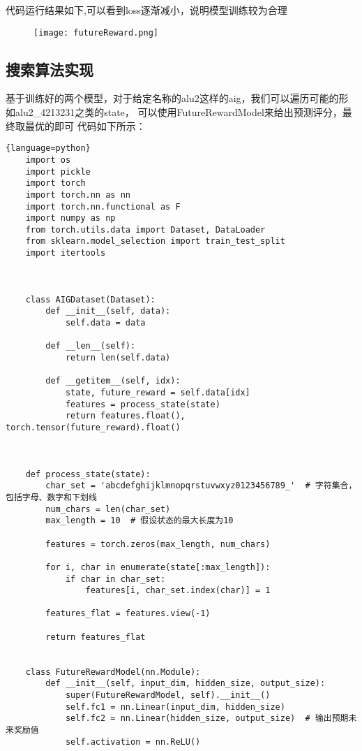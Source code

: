 \documentclass[UTF8]{ctexart}
\begin{document}
代码运行结果如下,可以看到loss逐渐减小，说明模型训练较为合理
\begin{figure}[H]
    \centering
    \texttt{[image: futureReward.png]}
    
    \caption{}
    \label{fig:futureReward}
\end{figure}\par
\subsection{搜索算法实现}
基于训练好的两个模型，对于给定名称的alu2这样的aig，我们可以遍历可能的形如alu2\_4213231之类的state，
可以使用FutureRewardModel来给出预测评分，最终取最优的即可
代码如下所示：
\begin{lstlisting}{language=python}
    import os
    import pickle
    import torch
    import torch.nn as nn
    import torch.nn.functional as F
    import numpy as np
    from torch.utils.data import Dataset, DataLoader
    from sklearn.model_selection import train_test_split
    import itertools
    
    
    
    class AIGDataset(Dataset):
        def __init__(self, data):
            self.data = data
    
        def __len__(self):
            return len(self.data)
    
        def __getitem__(self, idx):
            state, future_reward = self.data[idx]
            features = process_state(state)
            return features.float(), torch.tensor(future_reward).float()
    
    
    
    def process_state(state):
        char_set = 'abcdefghijklmnopqrstuvwxyz0123456789_'  # 字符集合，包括字母、数字和下划线
        num_chars = len(char_set)
        max_length = 10  # 假设状态的最大长度为10
    
        features = torch.zeros(max_length, num_chars)
    
        for i, char in enumerate(state[:max_length]):
            if char in char_set:
                features[i, char_set.index(char)] = 1
    
        features_flat = features.view(-1)
    
        return features_flat
    
    
    class FutureRewardModel(nn.Module):
        def __init__(self, input_dim, hidden_size, output_size):
            super(FutureRewardModel, self).__init__()
            self.fc1 = nn.Linear(input_dim, hidden_size)
            self.fc2 = nn.Linear(hidden_size, output_size)  # 输出预期未来奖励值
            self.activation = nn.ReLU()
    

\end{lstlisting}
\end{document}
